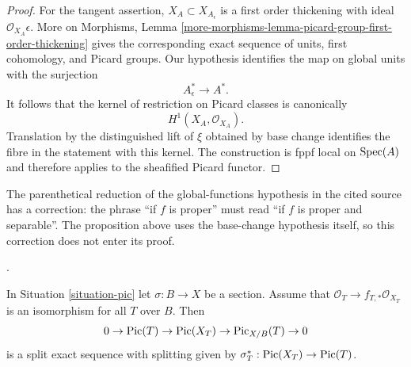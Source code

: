 \begin{proof}
For the tangent assertion, $X_A \subset X_{A_\epsilon}$ is a first order
thickening with ideal $\mathcal{O}_{X_A}\epsilon$. More on Morphisms, Lemma
\ref{more-morphisms-lemma-picard-group-first-order-thickening} gives the
corresponding exact sequence of units, first cohomology, and Picard groups.
Our hypothesis identifies the map on global units with the surjection
$$
A_\epsilon^* \longrightarrow A^*.
$$
It follows that the kernel of restriction on Picard classes is canonically
$$
H^1(X_A, \mathcal{O}_{X_A}).
$$
Translation by the distinguished lift of $\xi$ obtained by base change
identifies the fibre in the statement with this kernel. The construction is
fppf local on $\mathop{\mathrm{Spec}}(A)$ and therefore applies to the sheafified Picard
functor.
\end{proof}

\begin{remark}
\label{remark-formal-picard-separable-correction}
The parenthetical reduction of the global-functions hypothesis in the cited
source has a correction: the phrase ``if $f$ is proper'' must read ``if $f$
is proper and separable''. The proposition above uses the base-change
hypothesis itself, so this correction does not enter its proof.
\end{remark}

\begin{lemma}
\label{lemma-flat-geometrically-connected-fibres-with-section}
\begin{reference}
\cite[Expos\'e 232, Proposition 2.1, Corollary 2.4, and Remark 2.5]{FGA}.
\end{reference}
In Situation \ref{situation-pic} let $\sigma : B \to X$ be a section.
Assume that $\mathcal{O}_T \to f_{T, *}\mathcal{O}_{X_T}$ is an isomorphism
for all $T$ over $B$. Then
$$
0 \to \mathop{\mathrm{Pic}}\nolimits(T) \to \mathop{\mathrm{Pic}}\nolimits(X_T) \to \mathrm{Pic}_{X/B}(T) \to 0
$$
is a split exact sequence with splitting given by
$\sigma_T^* : \mathop{\mathrm{Pic}}\nolimits(X_T) \to \mathop{\mathrm{Pic}}\nolimits(T)$.
\end{lemma}

